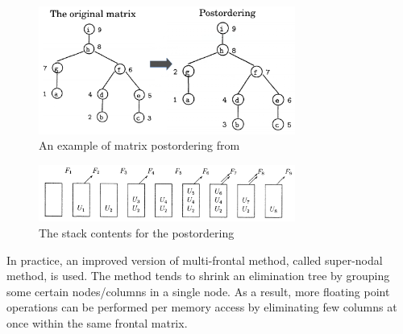 

\figpointer{\ref{fig:mm-matrix-postordering}}
\begin{figure}[htpb]
  \centering
  \includegraphics[width=0.75\textwidth]{figures/chapter-2/elimination-tree-mm-postordering.png}
\caption{An example of matrix postordering from \cite{mult-frontal-original:2}}
\label{fig:mm-matrix-postordering}
\end{figure}


\figpointer{\ref{fig:mm-contrib-matrix-manipulation}}
\begin{figure}[htpb]
  \centering
  \includegraphics[width=0.75\textwidth]{figures/chapter-2/mm-contrib-matrix-manipulation.png}
\caption{The stack contents for the postordering \cite{mult-frontal-original:2}}
\label{fig:mm-contrib-matrix-manipulation}
\end{figure}


In practice, an improved version of multi-frontal method, called super-nodal method, is used. The method tends to shrink an elimination tree by grouping some certain nodes/columns in a single node. As a result, more floating point operations can be performed per memory access by eliminating few columns at once within the same frontal matrix.\\





